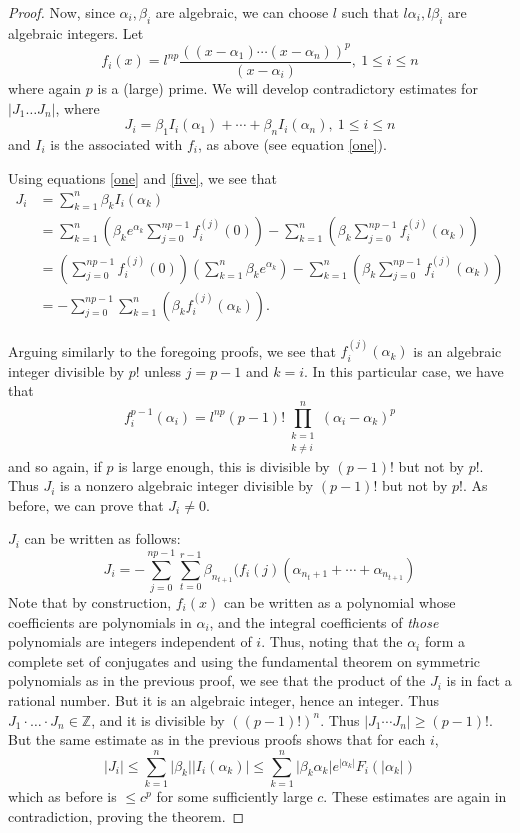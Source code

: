\documentclass[12pt]{article}
\newcommand{\Ints}{\mathbb{Z}}
\begin{document}
\begin{proof}
Now, since $\alpha_i, \beta_i$ are algebraic, we can choose $l$ such that $l\alpha_i, l\beta_i$ are algebraic integers. Let
\[f_i(x)=l^{np}\frac{((x-\alpha_1)\cdots(x-\alpha_n))^p}{(x-\alpha_i)},\ 1\leq i\leq n\]
where again $p$ is a (large) prime. We will develop contradictory estimates for $\lvert J_1\ldots J_n\rvert$, where
\[J_i=\beta_1 I_i(\alpha_1)+\cdots +\beta_n I_i(\alpha_n),\ 1\leq i\leq n\]
and $I_i$ is the  associated with $f_i$, as above (see equation \eqref{one}).

Using equations \eqref{one} and \eqref{five}, we see that
\begin{align*}J_i & =\sum_{k=1}^n \beta_k I_i(\alpha_k)\\
 & = \sum_{k=1}^n \left(\beta_k e^{\alpha_k}\sum_{j=0}^{np-1} f_i^{(j)}(0)\right) - \sum_{k=1}^n \left(\beta_k\sum_{j=0}^{np-1} f_i^{(j)}(\alpha_k)\right)\\
 & = \left(\sum_{j=0}^{np-1} f_i^{(j)}(0)\right)\left(\sum_{k=1}^n \beta_k e^{\alpha_k}\right) - \sum_{k=1}^n \left(\beta_k\sum_{j=0}^{np-1} f_i^{(j)}(\alpha_k)\right)\\
 & = -\sum_{j=0}^{np-1}\sum_{k=1}^n \left(\beta_k f_i^{(j)}(\alpha_k)\right) .
\end{align*}

Arguing similarly to the foregoing proofs, we see that $f_i^{(j)}(\alpha_k)$ is an algebraic integer divisible by $p!$ unless $j=p-1$ and $k=i$. In this particular case, we have that
\[f_i^{p-1}(\alpha_i)=l^{np}(p-1)!\prod_{\substack {k=1\\k\neq i}}^n (\alpha_i-\alpha_k)^p\]
and so again, if $p$ is large enough, this is divisible by $(p-1)!$ but not by $p!$. Thus $J_i$ is a nonzero algebraic integer divisible by $(p-1)!$ but not by $p!$. As before, we can prove that $J_i\neq 0$.

$J_i$ can be written as follows:
\[J_i=-\sum_{j=0}^{np-1} \sum_{t=0}^{r-1} \beta_{n_{t+1}}(f_i(j)\left(\alpha_{n_t+1}+\cdots+\alpha_{n_{t+1}}\right)\]
Note that by construction, $f_i(x)$ can be written as a polynomial whose coefficients are polynomials in $\alpha_i$, and the integral coefficients of \emph{those} polynomials are integers independent of $i$. Thus, noting that the $\alpha_i$ form a complete set of conjugates and using the fundamental theorem on symmetric polynomials as in the previous proof, we see that the product of the $J_i$ is in fact a rational number. But it is an algebraic integer, hence an integer. Thus $J_1\cdot \ldots \cdot J_n\in\Ints$, and it is divisible by $((p-1)!)^n$. Thus $\lvert J_1\cdots J_n\rvert \geq (p-1)!$. But the same estimate as in the previous proofs shows that for each $i$,
\[\lvert J_i\rvert \leq \sum_{k=1}^n \lvert \beta_k\rvert \lvert I_i(\alpha_k)\rvert\leq \sum_{k=1}^n\lvert \beta_k \alpha_k\rvert e^{\lvert \alpha_k\rvert}F_i(\lvert\alpha_k\rvert)\]
which as before is $\leq c^p$ for some sufficiently large $c$. These estimates are again in contradiction, proving the theorem.

\end{proof}
\end{document}
